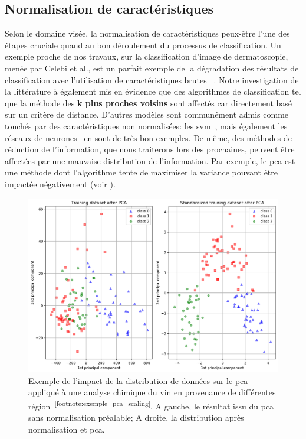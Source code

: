 \subsection{Normalisation de caractéristiques}
Selon le domaine visée, la normalisation de caractéristiques peux-être l'une des étapes cruciale quand au bon déroulement du processus de classification. Un exemple proche de nos travaux, sur la classification d'image de dermatoscopie, menée par Celebi et al., est un parfait exemple de la dégradation des résultats de classification avec l'utilisation de caractéristiques brutes ~\cite{Celebi2007}. Notre investigation de la littérature à également mis en évidence que des algorithmes de classification tel que la méthode des \textbf{k plus proches voisins} sont affectés car directement basé sur un critère de distance. D'autres modèles sont communément admis comme touchés par des caractéristiques non normalisées: les \gls{svm}~\cite{Juszczak2002}, mais également les réseaux de neurones~\cite{Celebi2007} en sont de très bon exemples. De même, des méthodes de réduction de l'information, que nous traiterons lors des prochaines, peuvent être affectées par une mauvaise distribution de l'information. Par exemple, le \gls{pca} est une méthode dont l'algorithme tente de maximiser la variance pouvant être impactée négativement (voir ).\par

\begin{figure}[H]
    \centering
    \includegraphics[width=0.8\linewidth]{contents/chapter_4/resources/example_pca_scaling.pdf}
    \caption{Exemple de l'impact de la distribution de données sur le \gls{pca} appliqué à une analyse chimique du vin en provenance de différentes région~\textsuperscript{\ref{footnote:exemple_pca_scaling}}. A gauche, le résultat issu du \gls{pca} sans normalisation préalable; A droite, la distribution après normalisation et \gls{pca}.}
    \label{fig:exemple_pca_scaling}
\end{figure}\par

